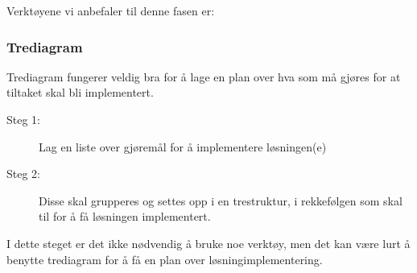 Verktøyene vi anbefaler til denne fasen er:

\subsubsection{Trediagram} Trediagram fungerer veldig bra for å lage en plan over hva som må gjøres for at tiltaket skal bli implementert. 
\begin{description}
    \item[Steg 1:] Lag en liste over gjøremål for å implementere løsningen(e)
    \item[Steg 2:] Disse skal grupperes og settes opp i en trestruktur, i rekkefølgen som skal til for å få løsningen implementert.
\end{description}

I dette steget er det ikke nødvendig å bruke noe verktøy, men det kan være lurt å benytte trediagram for å få en plan over løsningimplementering.

